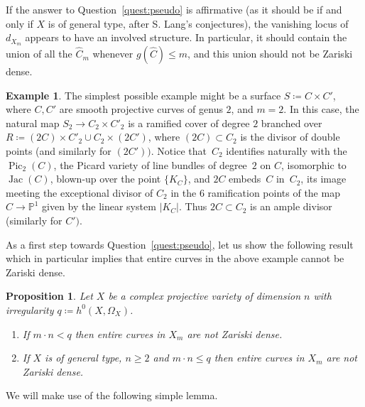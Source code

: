 \documentclass[JEP,XML,SOM,Unicode, NoEqCountersInSection,NoFloatCountersInSection,published]{cedram}
\DeclareMathOperator{\Jac}{Jac}
\DeclareMathOperator{\Pic}{Pic}
\theoremstyle{theorem}
\newtheorem{proposition}{Proposition} [section]
\theoremstyle{definition}
\newtheorem{example}{Example}
\def\bP{{\mathbb P}}
\begin{document}
If the answer to Question~\ref{quest:pseudo} is affirmative (as it should be if and only if $X$ is of general type, after S. Lang's conjectures), the vanishing locus of $d_{X_m}$ appears to have an involved structure. In particular, it should contain the union of all the $\hat{C}_m$ whenever $g(\hat{C})\leq m$, and this union should not be Zariski dense.

\begin{example} The simplest possible example might be a surface $S\coloneqq C\times C'$, where $C,C'$ are smooth projective curves of genus $2$, and $m=2$. In this case, the natural map $S_2\to C_2\times C'_2$ is a ramified cover of degree $2$ branched over $R\coloneqq (2C)\times C'_2\cup C_2\times (2C')$, where $(2C)\subset C_2$ is the divisor of double points (and similarly for $(2C'))$. Notice that~$C_2$ identifies naturally with the $\Pic_2(C)$, the Picard variety of line bundles of degree~$2$ on $C$, isomorphic to $\Jac(C)$, blown-up over the point $\{K_C\}$, and $2C$ embeds~$C$ in~$C_2$, its image meeting the exceptional divisor of $C_2$ in the $6$ ramification points of the map $C\to \bP^1$ given by the linear system $\vert K_C\vert$. Thus $2C\subset C_2$ is an ample divisor (similarly for $C')$.
\end{example}

As a first step towards Question~\ref{quest:pseudo}, let us show the following result which in particular implies that entire curves in the above example cannot be Zariski dense.

\begin{proposition} \label{prop:entirecurvesAlbanese}
Let $X$ be a complex projective variety of dimension $n$ with irregularity $q\coloneqq h^0(X,\Omega_X)$.
\begin{enumerate}
\item If $m \cdot n < q$ then entire curves in $X_m$ are not Zariski dense.
\item If $X$ is of general type, $n\geq 2$ and $m \cdot n \leq q$ then entire curves in $X_m$ are not Zariski dense.
\end{enumerate}
\end{proposition}

We will make use of the following simple lemma.
\end{document}
